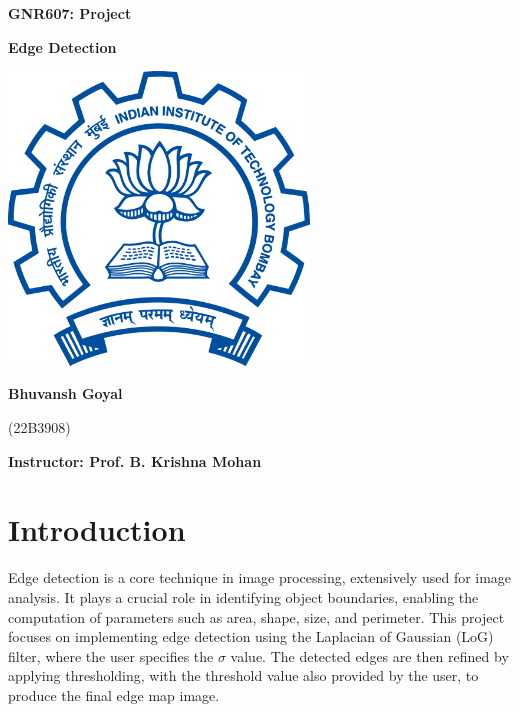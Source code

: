 \documentclass[12pt]{article}
\begin{document}
\begin{titlepage}
	\centering
	\vspace*{1cm}

	{\Huge\bfseries GNR607: Project}\par
	\vspace{0.5cm}
	{\LARGE\bfseries Edge Detection}\par

	\vspace{3cm}

	\includegraphics[width=0.6\textwidth]{icon.png}\par

	\vspace{3cm}

	{\LARGE\bfseries Bhuvansh Goyal}\par
	{\Large (22B3908)}\par

	\vspace{1.5cm}

	{\Large\bfseries Instructor: Prof. B. Krishna Mohan}\par
\end{titlepage}

\clearpage

\section*{Introduction}
Edge detection is a core technique in image processing, extensively used for image analysis. It plays a crucial role in identifying object boundaries, enabling the computation of parameters such as area, shape, size, and perimeter. This project focuses on implementing edge detection using the Laplacian of Gaussian (LoG) filter, where the user specifies the $\sigma$ value. The detected edges are then refined by applying thresholding, with the threshold value also provided by the user, to produce the final edge map image.
\end{document}
